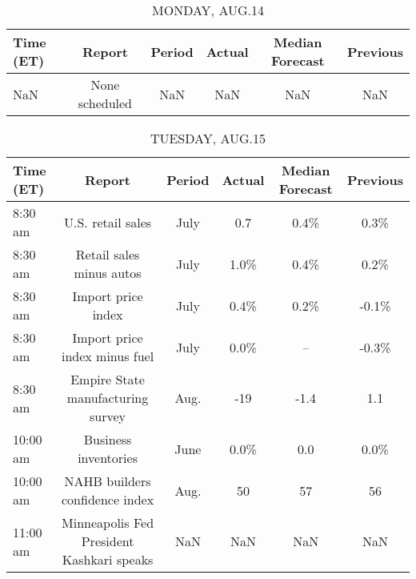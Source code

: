 \documentclass{article}%
\begin{document}
%
\normalsize%


\begin{table}[htbp]%
\caption{MONDAY, AUG.14}%
\centering%
\begin{adjustbox}{width=1\textwidth}%
\begin{tabular}{lccccc}
\toprule
Time (ET) &         Report & Period & Actual & Median Forecast & Previous \\
\midrule
      NaN & None scheduled &    NaN &    NaN &             NaN &      NaN \\
\bottomrule
\end{tabular}
%
\end{adjustbox}%
\end{table}

%


\begin{table}[htbp]%
\caption{TUESDAY, AUG.15}%
\centering%
\begin{adjustbox}{width=1\textwidth}%
\begin{tabular}{lccccc}
\toprule
Time (ET) &                                    Report & Period & Actual & Median Forecast & Previous \\
\midrule
  8:30 am &                         U.S. retail sales &   July &    0.7 &            0.4\% &     0.3\% \\
  8:30 am &                  Retail sales minus autos &   July &   1.0\% &            0.4\% &     0.2\% \\
  8:30 am &                        Import price index &   July &   0.4\% &            0.2\% &    -0.1\% \\
  8:30 am &             Import price index minus fuel &   July &   0.0\% &              -- &    -0.3\% \\
  8:30 am &         Empire State manufacturing survey &   Aug. &    -19 &            -1.4 &      1.1 \\
 10:00 am &                      Business inventories &   June &   0.0\% &             0.0 &     0.0\% \\
 10:00 am &            NAHB builders confidence index &   Aug. &     50 &              57 &       56 \\
 11:00 am & Minneapolis Fed President Kashkari speaks &    NaN &    NaN &             NaN &      NaN \\
\bottomrule
\end{tabular}
%
\end{adjustbox}%
\end{table}

%
\end{document}
